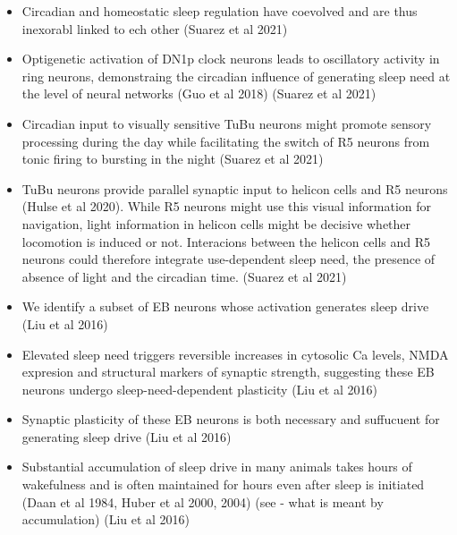 \documentclass[11pt]{article}
\begin{document}
\begin{itemize}
    \item Circadian and homeostatic sleep regulation have coevolved and are thus inexorabl linked to ech other \cite{suarez-grimaltNeuralArchitectureSleep2021}
    (Suarez et al 2021)

    \item Optigenetic activation of DN1p clock neurons leads to oscillatory activity in ring neurons,
    demonstraing the circadian influence of generating sleep need at the level of neural networks (Guo et al 2018) \cite{suarez-grimaltNeuralArchitectureSleep2021}
    (Suarez et al 2021)

    \item Circadian input to visually sensitive TuBu neurons might promote sensory processing during the day while facilitating
    the switch of R5 neurons from tonic firing to bursting in the night \cite{suarez-grimaltNeuralArchitectureSleep2021}
    (Suarez et al 2021)

    \item TuBu neurons provide parallel synaptic input to helicon cells and R5 neurons (Hulse et al 2020).
    While R5 neurons might use this visual information for navigation, light information in helicon cells might be
    decisive whether locomotion is induced or not. Interacions between the helicon cells and R5
    neurons could therefore integrate use-dependent sleep need, the presence of absence of light and the circadian time.
    \cite{suarez-grimaltNeuralArchitectureSleep2021}
    (Suarez et al 2021)

    \item We identify a subset of EB neurons whose activation generates sleep drive \cite{liuSleepDriveEncoded2016}
    (Liu et al 2016)
    
    \item Elevated sleep need triggers reversible increases in cytosolic Ca levels, NMDA expresion and structural markers
    of synaptic strength, suggesting these EB neurons undergo sleep-need-dependent plasticity \cite{liuSleepDriveEncoded2016}
    (Liu et al 2016)

    \item Synaptic plasticity of these EB neurons is both necessary and suffucuent for generating sleep drive \cite{liuSleepDriveEncoded2016}
    (Liu et al 2016)

    \item Substantial accumulation of sleep drive in many animals takes hours of wakefulness and is often
    maintained for hours even after sleep is initiated (Daan et al 1984, Huber et al 2000, 2004) \cite{liuSleepDriveEncoded2016}
    (see - what is meant by accumulation)
    (Liu et al 2016)


\end{itemize}
\end{document}
